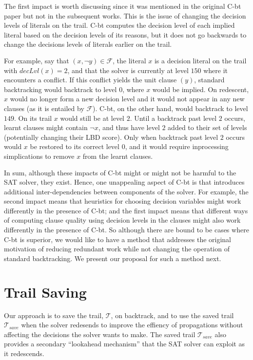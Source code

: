 \documentclass[runningheads]{llncs}
\newcommand{\sat}{SAT\xspace}
\newcommand{\trail}{\ensuremath{\mathcal{T}}}
\newcommand{\dlevel}[1]{\ensuremath{\mathit{decLvl}(#1)}}
\newcommand{\formula}{\ensuremath{\mathcal{F}}}
\newcommand{\cbt}{C-bt\xspace}
\newcommand{\trailsave}{\trail_{\mathit{save}}}
\begin{document}
The first impact is worth discussing since it was mentioned in the
original \cbt paper \cite{DBLP:conf/lpar/JiangZ13} but not in the
subsequent works. This is the issue of changing the decision levels of
literals on the trail. \cbt computes the decision level of each
implied literal based on the decision levels of its reasons, but it
does not go backwards to change the decisions levels of literals
earlier on the trail.

\begin{example}
    For example, say that $(x, \lnot y)\in \formula$, the literal $x$
    is a decision literal on the trail with $\dlevel{x}=2$, and that
    the solver is currently at level $150$ where it encounters a
    conflict. If this conflict yields the unit clause $(y)$, standard
    backtracking would backtrack to level $0$, where $x$ would be
    implied. On redescent, $x$ would no longer form a new decision
    level and it would not appear in any new clauses (as it is
    entailed by $\formula$). \cbt, on the other hand, would backtrack
    to level $149$. On its trail $x$ would still be at level
    $2$. Until a backtrack past level $2$ occurs, learnt clauses might
    contain $\lnot x$, and thus have level $2$ added to their set of
    levels (potentially changing their LBD score). Only when backtrack
    past level $2$ occurs would $x$ be restored to its correct level
    $0$, and it would require inprocessing simplications to remove $x$
    from the learnt clauses.
\end{example}

In sum, although these impacts of \cbt might or might not be harmful
to the \sat solver, they exist. Hence, one unappealing aspect of \cbt
is that introduces additional inter-dependencies between components of
the solver. For example, the second impact means that heuristics for
choosing decision variables might work differently in the presence of
\cbt; and the first impact means that different ways of computing
clause quality using decision levels in the clauses might also work
differently in the presence of \cbt. So although there are bound to be
cases where \cbt is superior, we would like to have a method that
addresses the original motivation of reducing redundant work while not
changing the operation of standard backtracking. We present our
proposal for such a method next.

\section{Trail Saving}
Our approach is to save the trail, $\trail$, on backtrack, and to use
the saved trail $\trailsave$ when the solver redesends to improve the
effiency of propagations without affecting the decisions the solver
wants to make. The saved trail $\trailsave$ also provides a secondary
``lookahead mechanism'' that the \sat solver can exploit as it
redescends.
\end{document}
